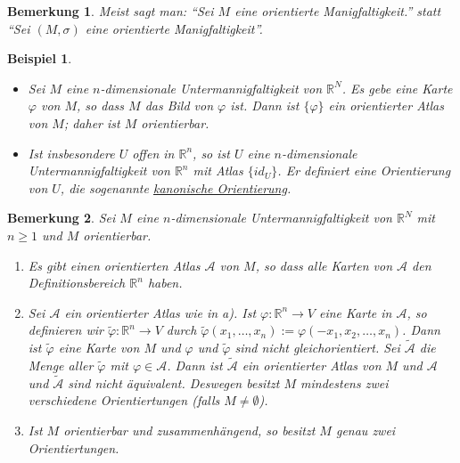 \documentclass[10pt,a4paper]{report}
\newtheorem*{remark}{Bemerkung}
\newtheorem*{example}{Beispiel}
\begin{document}
\begin{remark}
  Meist sagt man: ``Sei $M$ eine orientierte Manigfaltigkeit.'' statt ``Sei $(M, \sigma)$ eine orientierte Manigfaltigkeit''.
\end{remark}

\begin{example}
  \begin{itemize}
  \item Sei $M$ eine $n$-dimensionale Untermannigfaltigkeit von $\mathbb{R}^{N}$.
    Es gebe eine Karte $\varphi$ von $M$, so dass $M$ das Bild von $\varphi$ ist.
    Dann ist $\{ \varphi \}$ ein orientierter Atlas von $M$; daher ist $M$ orientierbar.
  \item Ist insbesondere $U$ offen in $\mathbb{R}^{n}$, so ist $U$ eine $n$-dimensionale Untermannigfaltigkeit von $\mathbb{R}^{n}$ mit Atlas $\{ id_{U} \}$.
    Er definiert eine Orientierung von $U$, die sogenannte \underline{kanonische Orientierung}.
  \end{itemize}
\end{example}

\begin{remark}
  Sei $M$ eine $n$-dimensionale Untermannigfaltigkeit von $\mathbb{R}^{N}$ mit $n \ge 1$ und $M$ orientierbar.
  \begin{enumerate}[label={\alph*)}]
  \item Es gibt einen orientierten Atlas $\mathscr{A}$ von $M$, so dass alle Karten von $\mathscr{A}$ den Definitionsbereich $\mathbb{R}^{n}$ haben.
  \item Sei $\mathscr{A}$ ein orientierter Atlas wie in a).
    Ist $\varphi : \mathbb{R}^{n} \rightarrow V$ eine Karte in $\mathscr{A}$, so definieren wir $\tilde{\varphi} : \mathbb{R}^{n} \rightarrow V$ durch $\tilde{\varphi}(x_{1}, \dots, x_{n}) := \varphi(-x_{1}, x_{2}, \dots, x_{n})$.
    Dann ist $\tilde{\varphi}$ eine Karte von $M$ und $\varphi$ und $\tilde{\varphi}$ sind nicht gleichorientiert.
    Sei $\tilde{\mathscr{A}}$ die Menge aller $\tilde{\varphi}$ mit $\varphi \in \mathscr{A}$.
    Dann ist $\tilde{\mathscr{A}}$ ein orientierter Atlas von $M$ und $\mathscr{A}$ und $\tilde{\mathscr{A}}$ sind nicht äquivalent.
    Deswegen besitzt $M$ mindestens zwei verschiedene Orientiertungen (falls $M \ne \emptyset$).
  \item Ist $M$ orientierbar und zusammenhängend, so besitzt $M$ genau zwei Orientiertungen.
  \end{enumerate}
\end{remark}
\end{document}
